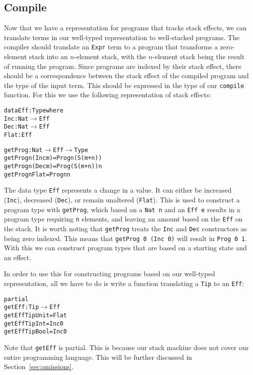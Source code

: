 \subsection{Compile}
Now that we have a representation for programs that tracks stack effects, we can translate terms in our well-typed representation to well-stacked programs. The compiler should translate an \texttt{Expr} term to a program that transforms a zero-element stack into an $n$-element stack, with the $n$-element stack being the result of running the program. Since programs are indexed by their stack effect, there should be a correspondence between the stack effect of the compiled program and the type of the input term. This should be expressed in the type of our \texttt{compile} function. For this we use the following representation of stack effects:

\begin{alltt}
data Eff : Type where
  Inc  : Nat \(\rightarrow\) Eff
  Dec  : Nat \(\rightarrow\) Eff
  Flat :        Eff

getProg : Nat \(\rightarrow\) Eff \(\rightarrow\) Type
getProg n (Inc m) = Prog n (S (m + n))
getProg n (Dec m) = Prog (S (m + n)) n
getProg n Flat    = Prog n n
\end{alltt}

The data type \texttt{Eff} represents a change in a value. It can either be increased (\texttt{Inc}), decreased (\texttt{Dec}), or remain unaltered (\texttt{Flat}). This is used to construct a program type with \texttt{getProg}, which based on a \texttt{Nat n} and an \texttt{Eff e} results in a program type requiring \texttt{n} elements, and leaving an amount based on the \texttt{Eff} on the stack. It is worth noting that \texttt{getProg} treats the \texttt{Inc} and \texttt{Dec} constructors as being zero indexed. This means that \texttt{getProg 0 (Inc 0)} will result in \texttt{Prog 0 1}. With this we can construct program types that are based on a starting state and an effect.

In order to use this for constructing programs based on our well-typed representation, all we have to do is write a function translating a \texttt{Tip} to an \texttt{Eff}:

\begin{alltt}
partial
getEff : Tip \(\rightarrow\) Eff
getEff TipUnit = Flat
getEff TipInt  = Inc 0
getEff TipBool = Inc 0
\end{alltt}

Note that \texttt{getEff} is partial. This is because our stack machine does not cover our entire programming language. This will be further discussed in Section~\ref{sec:omissions}.

